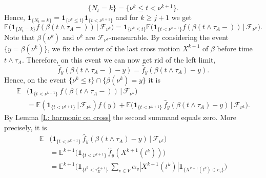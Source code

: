 \documentclass[11pt]{article}
\makeatletter
\renewenvironment{proof}[1][\proofname]{
   \par\pushQED{\qed}\normalfont
   \topsep6\p@\@plus6\p@\relax
   \trivlist\item[\hskip\labelsep\bfseries#1\@addpunct{.}]
   \ignorespaces
}{
   \popQED\endtrivlist\@endpefalse
}
\numberwithin{equation}{section}
\def\Ex{\mathbb{E}}
\def\indicator{\boldsymbol{1}}
\makeatother
\begin{document}
\begin{proof}[Proof of Lemma \ref{L:remains to consider the first cross motion}]
\begin{equation}
    \{N_t = k \} = \{\nu^k \leq t < \nu^{k+1}\}.
  \end{equation} 
  Hence,
  $\indicator_{\{N_t = k \}} = 
  \indicator_{\{\nu^k \leq t\}} 
  \indicator_{\{t < \nu^{k+1}\}}$
  and for $k \geq j+1$ we get 
  \begin{equation}\nonumber
    \Ex \big( \indicator_{\{N_t= k\}} 
      f(\beta(t \land \tau_A-)) 
      \,\big|\, \mathcal{F}_{\nu^k} \big) 
    = \indicator_{\{\nu^k \leq t \}}
    \Ex \big( \indicator_{\{t < \nu^{k+1}\}} 
    f(\beta(t \land \tau_A-)) 
    \,\big|\, \mathcal{F}_{\nu^k} \big).
  \end{equation} 
  Note that $\beta(\nu^k)$ and $\nu^k$ are 
  $\mathcal{F}_{\nu^k}$-measurable. 
  By considering the event \hbox{$\{y= \beta(\nu^k)\}$,} 
  we fix the center of the last cross 
  motion $X^{k+1}$ of $\beta$ before time $t \land \tau_A$. 
  Therefore, on this event we can now get rid of the left limit,
  \begin{equation}\nonumber
    \hat{f}_y(\beta(t \land \tau_A -) - y) 
    = \hat{f}_y(\beta(t \land \tau_A) - y). 
  \end{equation}
  Hence, on the event $\{\nu^k \leq t\} \cap \{\beta(\nu^k) = y\}$ it is 
  \begin{equation}\nonumber 
  \begin{split}
    \Ex &\big( \indicator_{\{t < \nu^{k+1}\}} \,
      f(\beta(t \land \tau_A-)) 
      \,\big|\, \mathcal{F}_{\nu^k} \big) \\
    &= \Ex ( \indicator_{\{t < \nu^{k+1}\} }  
        \,|\, \mathcal{F}_{\nu^k} ) f(y)
    + \Ex \big( \indicator_{\{t < \nu^{k+1}\}} \,
        \hat{f}_y
          (\beta(t \land \tau_A) -y) \,\big|\, 
        \mathcal{F}_{\nu^k} \big).
  \end{split}
  \end{equation} 
  By Lemma \ref{L: harmonic on cross} the second summand equals zero. 
  More precisely, it is 
  \begin{equation}\nonumber 
  \begin{split}
      \Ex& \big( \indicator_{\{t < \nu^{k+1}\}} \,
        \hat{f}_y
          (\beta(t \land \tau_A) -y) \,\big|\, 
        \mathcal{F}_{\nu^k} \big) \\
    & =
    \Ex^{k+1} \big( \indicator_{\{t < \nu^{k+1}\}} \, \hat{f}_y(X^{k+1}(t^k)) \big)  \\
    & = 
    \Ex^{k+1} \Big( 
      \indicator_{\{t^k < \tau^{k+1}_E\}}\, 
        \sum_{v \in V} \alpha_v |X^{k+1}(t^k)| 
          \indicator_{\{X^{k+1}(t^k) \in e_v\}}\Big)\\ 

\end{split}
\end{equation}
\end{proof}
\end{document}
